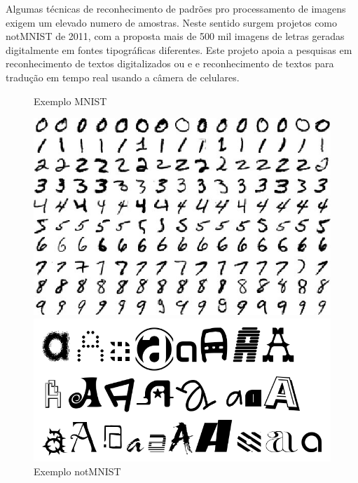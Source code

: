 Algumas técnicas de reconhecimento de padrões pro processamento de imagens exigem um elevado numero de amostras. Neste sentido surgem projetos como notMNIST de 2011, com a proposta mais de 500 mil imagens de letras geradas digitalmente em fontes tipográficas diferentes. Este projeto apoia a pesquisas em reconhecimento de textos digitalizados ou  e e reconhecimento de textos para tradução em tempo real usando a câmera de celulares.

\begin{figure}[htb]
	\label{teste}
	\centering
	\begin{minipage}{0.4\textwidth}
		\centering
		\caption{Exemplo MNIST} 
		\includegraphics[scale=0.3]{img/mnist.jpeg}
	\end{minipage}
	\hfill
	\begin{minipage}{0.4\textwidth}
		\centering
		\caption{Exemplo notMNIST} 
		\includegraphics[scale=0.3]{img/nmn.png}
	\end{minipage}
\end{figure}

